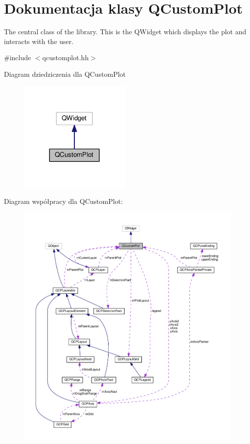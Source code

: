 \hypertarget{class_q_custom_plot}{}\section{Dokumentacja klasy Q\+Custom\+Plot}
\label{class_q_custom_plot}


The central class of the library. This is the Q\+Widget which displays the plot and interacts with the user.  




{\ttfamily \#include $<$qcustomplot.\+hh$>$}



Diagram dziedziczenia dla Q\+Custom\+Plot\nopagebreak
\begin{figure}[H]
\begin{center}
\leavevmode
\includegraphics[width=156pt]{class_q_custom_plot__inherit__graph}
\end{center}
\end{figure}


Diagram współpracy dla Q\+Custom\+Plot\+:\nopagebreak
\begin{figure}[H]
\begin{center}
\leavevmode
\includegraphics[width=350pt]{class_q_custom_plot__coll__graph}
\end{center}
\end{figure}
